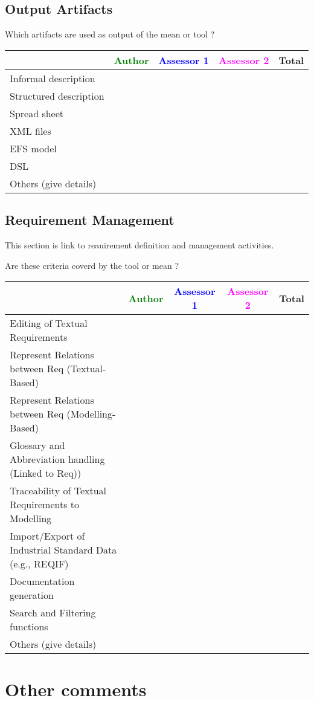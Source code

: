 \subsection{Output Artifacts}

Which artifacts are used as output of the mean or tool  ? 


\begin{tabular}{|l | c | c | c | c|}
\hline
& \textcolor{green}{Author} & \textcolor{blue}{Assessor 1} & \textcolor{magenta}{Assessor 2} & Total \\
\hline 
Informal description & & & &  \\
\hline
Structured description & & & & \\
\hline
Spread sheet & & & & \\
\hline
XML files & & & & \\
\hline
EFS model & & & & \\
\hline
DSL & & & & \\
\hline
Others (give details) & & & & \\
\hline
\end{tabular}


\subsection{Requirement Management}

This section is link to reauirement definition and management activities.

Are these criteria coverd by the tool or mean ? 


\begin{tabular}{|l | c | c | c | c|}
\hline
& \textcolor{green}{Author} & \textcolor{blue}{Assessor 1} & \textcolor{magenta}{Assessor 2} & Total \\
\hline 
Editing of Textual Requirements & & & &  \\
\hline
Represent Relations between Req (Textual-Based) & & & & \\
\hline
Represent Relations between Req (Modelling-Based) & & & & \\
\hline
Glossary and Abbreviation handling (Linked to Req)) & & & & \\
\hline
Traceability of Textual Requirements to Modelling & & & & \\
\hline
Import/Export of Industrial Standard Data (e.g., REQIF) & & & & \\
\hline
Documentation generation & & & &  \\
\hline
Search and Filtering functions & & & & \\
\hline
Others (give details) & & & & \\
\hline
\end{tabular}



\section{Other comments}



\begin{comment}
This section is available for the author or the assessors to  complete the description and criteria.
\end{comment}



